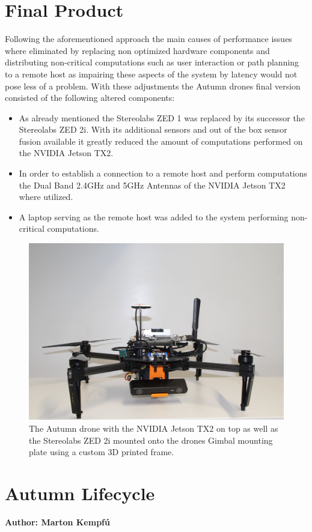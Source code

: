 \section{Final Product}
Following the aforementioned approach the main causes of performance issues where eliminated by replacing non optimized hardware components and distributing non-critical computations such as user interaction or path planning to a remote host as impairing these aspects of the system by latency would not pose less of a problem. 
With these adjustments the Autumn drones final version consisted of the following altered components:
\begin{itemize}
	\item As already mentioned the Stereolabs ZED 1 was replaced by its successor the Stereolabs ZED 2i. With its additional sensors and out of the box sensor fusion available it greatly reduced the amount of computations performed on the NVIDIA Jetson TX2. 
	\item In order to establish a connection to a remote host and perform computations the Dual Band 2.4GHz and 5GHz Antennas of the NVIDIA Jetson TX2 where utilized. 
	\item A laptop serving as the remote host was added to the system performing non-critical computations.
\end{itemize}

\begin{figure}
	\centering
	\includegraphics[width=0.9\linewidth]{img/autumnDrone}
	\caption{
		The Autumn drone with the NVIDIA Jetson TX2 on top as well as the Stereolabs ZED 2i mounted onto the drones Gimbal mounting plate using a custom 3D printed frame. 
	}
	\label{fig:autumn}
\end{figure}


\section{Autumn Lifecycle}
\textbf{Author: Marton Kempfú} 


\filbreak